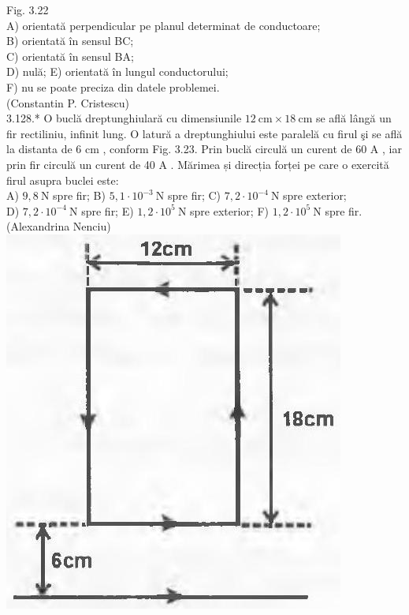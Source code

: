 \documentclass[10pt]{article}
\begin{document}
Fig. 3.22\\
A) orientată perpendicular pe planul determinat de conductoare;\\
B) orientată în sensul BC;\\
C) orientată în sensul BA;\\
D) nulă; E) orientată în lungul conductorului;\\
F) nu se poate preciza din datele problemei.\\
(Constantin P. Cristescu)\\
3.128.* O buclă dreptunghiulară cu dimensiunile $12 \mathrm{~cm} \times 18 \mathrm{~cm}$ se află lângă un fir rectiliniu, infinit lung. O latură a dreptunghiului este paralelă cu firul şi se află la distanta de 6 cm , conform Fig. 3.23. Prin buclă circulă un curent de 60 A , iar prin fir circulă un curent de 40 A . Mărimea și direcția forței pe care o exercită firul asupra buclei este:\\
A) $9,8 \mathrm{~N}$ spre fir; B) $5,1 \cdot 10^{-3} \mathrm{~N}$ spre fir; C) $7,2 \cdot 10^{-4} \mathrm{~N}$ spre exterior;\\
D) $7,2 \cdot 10^{-4} \mathrm{~N}$ spre fir; E) $1,2 \cdot 10^{5} \mathrm{~N}$ spre exterior; F) $1,2 \cdot 10^{5} \mathrm{~N}$ spre fir.\\
(Alexandrina Nenciu)\\
\includegraphics[max width=\textwidth, center]{2025_07_01_5b3ff9fa0d508c8e9f17g-171(1)}
\end{document}
